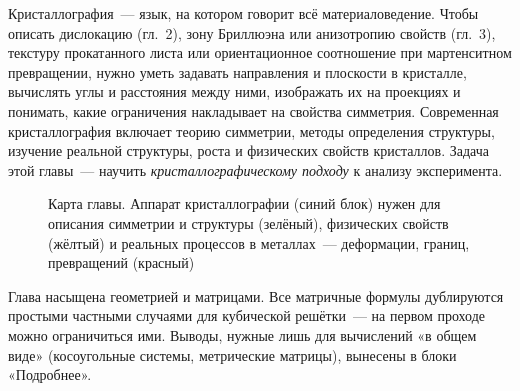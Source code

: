 Кристаллография~— язык, на котором говорит всё материаловедение. Чтобы
описать дислокацию (гл.~2), зону Бриллюэна или анизотропию свойств
(гл.~3), текстуру прокатанного листа или ориентационное соотношение при
мартенситном превращении, нужно уметь задавать направления и плоскости в
кристалле, вычислять углы и расстояния между ними, изображать их на
проекциях и понимать, какие ограничения накладывает на свойства
симметрия. Современная кристаллография включает теорию симметрии,
методы определения структуры, изучение реальной структуры, роста и
физических свойств кристаллов. Задача этой главы~— научить
\emph{кристаллографическому подходу} к анализу эксперимента.

\begin{figure}[ht]
\centering
{}
\caption{Карта главы. Аппарат кристаллографии (синий блок) нужен для
описания симметрии и структуры (зелёный), физических свойств (жёлтый) и
реальных процессов в металлах~— деформации, границ, превращений
(красный)}
\label{fig:ch1-map}
\end{figure}

\begin{vnimanie}
Глава насыщена геометрией и матрицами. Все матричные формулы
дублируются простыми частными случаями для кубической решётки~— на
первом проходе можно ограничиться ими. Выводы, нужные лишь для
вычислений «в общем виде» (косоугольные системы, метрические матрицы),
вынесены в блоки «Подробнее».
\end{vnimanie}
